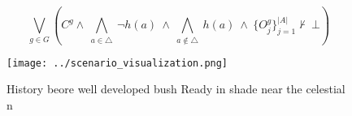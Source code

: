 \documentclass[a4paper]{article}
\begin{document}
\[\bigvee_{g\in G} (C^g \wedge\ \bigwedge_{a\in \triangle}\ \neg h(a)\ \wedge\ \bigwedge_{a\notin \triangle}\ h(a)\ \wedge\ \{O_j^g\}_{j=1}^{|A|} \nvdash\ \bot )\]

\begin{figure}
\centering
\texttt{[image: ../scenario\_visualization.png]}
\caption{History beore well developed bush Ready in shade near the celestial n
}
\end{figure}
 
\end{document}

